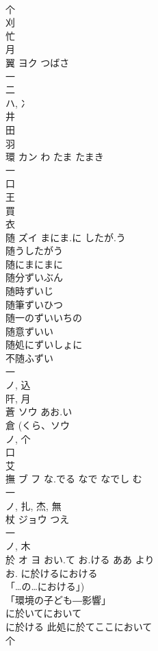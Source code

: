 \documentclass[8pt]{extreport}
\begin{document}
\begin{CJK}{UTF8}{min}
\\	个 
\\	刈 
\\	忙 
\\	月 
\\	翼	ヨク	つばさ	
\\	一 
\\	二 
\\	ハ, 冫 
\\	井 
\\	田 
\\	羽 
\\	環	カン	わ たま たまき	
\\	一 
\\	口 
\\	王 
\\	買 
\\	衣 
\\	随	ズイ	まにま.に したが.う	
\\	随うしたがう
\\	随にまにまに
\\	随分ずいぶん
\\	随時ずいじ
\\	随筆ずいひつ
\\	随一のずいいちの
\\	随意ずいい
\\	随処にずいしょに
\\	不随ふずい
\\	一 
\\	ノ, 込 
\\	阡, 月 
\\	蒼	ソウ	あお.い	
\\	倉 (くら、ソウ 
\\	ノ, 个 
\\	口 
\\	艾 
\\	撫	ブ フ	な.でる なで なでし む	
\\	一 
\\	ノ, 扎, 杰, 無 
\\	杖	ジョウ	つえ	
\\	一 
\\	ノ, 木 
\\	於	オ ヨ	おい.て お.ける ああ より	
\\	お.		に於けるにおける 
\\	「…の…における」) 
\\	「環境の子ども―影響」 
\\	に於いてにおいて 
\\	に於ける 此処に於てここにおいて 
\\	个 

\end{CJK}
\end{document}
